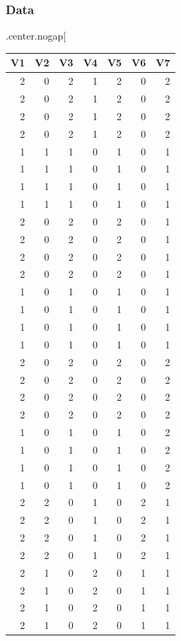 \documentclass[
]{article}
\begin{document}
\hypertarget{data}{%
\subsubsection{Data}\label{data}}

.center.nogap{[}

\begin{tabular}{r|r|r|r|r|r|r}
\hline
V1 & V2 & V3 & V4 & V5 & V6 & V7\\
\hline
2 & 0 & 2 & 1 & 2 & 0 & 2\\
\hline
2 & 0 & 2 & 1 & 2 & 0 & 2\\
\hline
2 & 0 & 2 & 1 & 2 & 0 & 2\\
\hline
2 & 0 & 2 & 1 & 2 & 0 & 2\\
\hline
1 & 1 & 1 & 0 & 1 & 0 & 1\\
\hline
1 & 1 & 1 & 0 & 1 & 0 & 1\\
\hline
1 & 1 & 1 & 0 & 1 & 0 & 1\\
\hline
1 & 1 & 1 & 0 & 1 & 0 & 1\\
\hline
2 & 0 & 2 & 0 & 2 & 0 & 1\\
\hline
2 & 0 & 2 & 0 & 2 & 0 & 1\\
\hline
2 & 0 & 2 & 0 & 2 & 0 & 1\\
\hline
2 & 0 & 2 & 0 & 2 & 0 & 1\\
\hline
1 & 0 & 1 & 0 & 1 & 0 & 1\\
\hline
1 & 0 & 1 & 0 & 1 & 0 & 1\\
\hline
1 & 0 & 1 & 0 & 1 & 0 & 1\\
\hline
1 & 0 & 1 & 0 & 1 & 0 & 1\\
\hline
2 & 0 & 2 & 0 & 2 & 0 & 2\\
\hline
2 & 0 & 2 & 0 & 2 & 0 & 2\\
\hline
2 & 0 & 2 & 0 & 2 & 0 & 2\\
\hline
2 & 0 & 2 & 0 & 2 & 0 & 2\\
\hline
1 & 0 & 1 & 0 & 1 & 0 & 2\\
\hline
1 & 0 & 1 & 0 & 1 & 0 & 2\\
\hline
1 & 0 & 1 & 0 & 1 & 0 & 2\\
\hline
1 & 0 & 1 & 0 & 1 & 0 & 2\\
\hline
2 & 2 & 0 & 1 & 0 & 2 & 1\\
\hline
2 & 2 & 0 & 1 & 0 & 2 & 1\\
\hline
2 & 2 & 0 & 1 & 0 & 2 & 1\\
\hline
2 & 2 & 0 & 1 & 0 & 2 & 1\\
\hline
2 & 1 & 0 & 2 & 0 & 1 & 1\\
\hline
2 & 1 & 0 & 2 & 0 & 1 & 1\\
\hline
2 & 1 & 0 & 2 & 0 & 1 & 1\\
\hline
2 & 1 & 0 & 2 & 0 & 1 & 1\\
\hline
\end{tabular}
\end{document}
